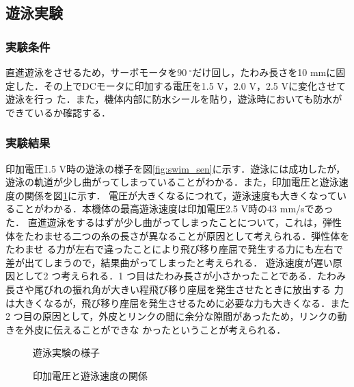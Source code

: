 \subsection{遊泳実験}
\subsubsection{実験条件}
直進遊泳をさせるため，サーボモータを$90\:^\circ$だけ回し，たわみ長さを10 mmに固定した．その上でDCモータに印加する電圧を1.5 V，2.0 V，2.5 Vに変化させて遊泳を行っ
た．また，機体内部に防水シールを貼り，遊泳時においても防水ができているか確認する．



\subsubsection{実験結果}
印加電圧1.5 V時の遊泳の様子を図\ref{fig:swim_sen}に示す．遊泳には成功したが，遊泳の軌道が少し曲がってしまっていることがわかる．また，印加電圧と遊泳速度の関係を図\ref{fig:speed}に示す．
電圧が大きくなるにつれて，遊泳速度も大きくなっていることがわかる．本機体の最高遊泳速度は印加電圧2.5 V時の43 mm/sであった．
直進遊泳をするはずが少し曲がってしまったことについて，これは，弾性体をたわませる二つの糸の長さが異なることが原因として考えられる．弾性体をたわませ
る力が左右で違ったことにより飛び移り座屈で発生する力にも左右で差が出てしまうので，結果曲がってしまったと考えられる．
遊泳速度が遅い原因として2 つ考えられる．1 つ目はたわみ長さが小さかったことである．たわみ長さや尾びれの振れ角が大きい程飛び移り座屈を発生させたときに放出する
力は大きくなるが，飛び移り座屈を発生させるために必要な力も大きくなる．また2 つ目の原因として，外皮とリンクの間に余分な隙間があったため，リンクの動きを外皮に伝えることができな
かったということが考えられる．
\begin{figure}[htbp]
    \centering
    \begin{minipage}[b]{0.5\linewidth}
        \centering
        \caption{遊泳実験の様子\cite{kyu}}
        \label{fig:swim_sen}  
    \end{minipage}
    \hspace{0.05\linewidth}
    \begin{minipage}[b]{0.4\linewidth}
        \centering
        \caption{印加電圧と遊泳速度の関係\cite{kyu}}
        \label{fig:speed}  
    \end{minipage} 
\end{figure}
